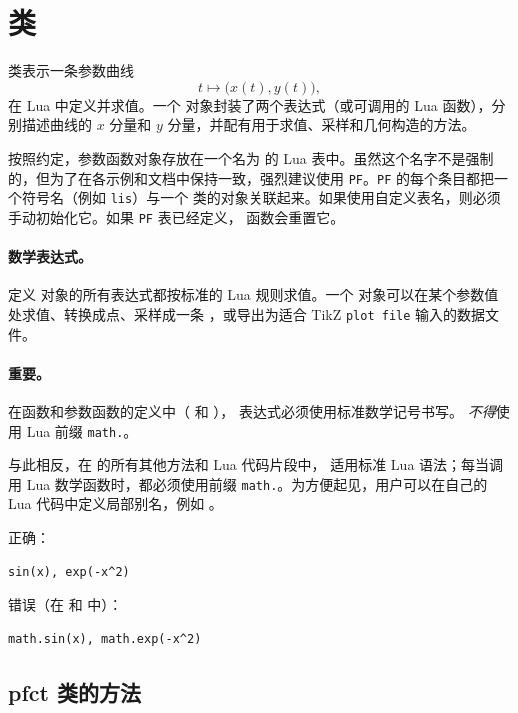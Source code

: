 \newpage
\section{ 类}
\label{sec:class_pfct}

 类表示一条参数曲线
\[
t \longmapsto \bigl(x(t),y(t)\bigr),
\]
在 Lua 中定义并求值。一个  对象封装了两个表达式（或可调用的 Lua 函数），分别描述曲线的 $x$ 分量和 $y$ 分量，并配有用于求值、采样和几何构造的方法。

按照约定，参数函数对象存放在一个名为  的 Lua 表中。虽然这个名字不是强制的，但为了在各示例和文档中保持一致，强烈建议使用 \texttt{PF}。\texttt{PF} 的每个条目都把一个符号名（例如 \texttt{lis}）与一个  类的对象关联起来。如果使用自定义表名，则必须手动初始化它。如果 \texttt{PF} 表已经定义， 函数会重置它。

\paragraph{数学表达式。}
定义  对象的所有表达式都按标准的 Lua 规则求值。一个  对象可以在某个参数值处求值、转换成点、采样成一条 ，或导出为适合 TikZ \texttt{plot file} 输入的数据文件。

\paragraph{重要。}
在函数和参数函数的定义中（ 和 ），
表达式必须使用标准数学记号书写。
\emph{不得}使用 Lua 前缀 \texttt{math.}。

与此相反，在  的所有其他方法和 Lua 代码片段中，
适用标准 Lua 语法；每当调用 Lua 数学函数时，都必须使用前缀 \texttt{math.}。为方便起见，用户可以在自己的 Lua 代码中定义局部别名，例如 。

\medskip
正确：
\begin{verbatim}
sin(x), exp(-x^2)
\end{verbatim}

错误（在  和  中）：
\begin{verbatim}
math.sin(x), math.exp(-x^2)
\end{verbatim}

\subsection{pfct 类的方法}
\vspace{1em}

